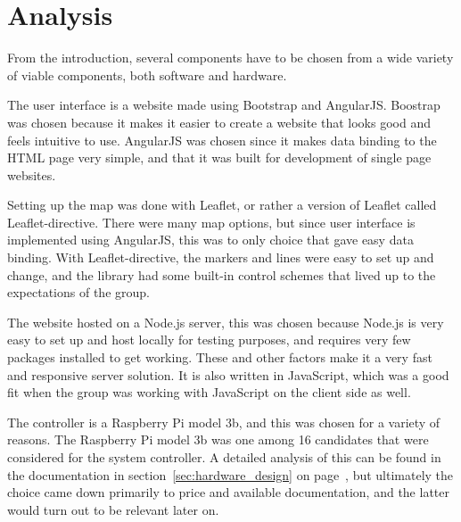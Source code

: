 \chapter{Analysis}

From the introduction, several components have to be chosen from a wide variety of viable components, both software and hardware.

The user interface is a website made using Bootstrap\cite{bootstrap} and AngularJS\cite{angular}. 
Boostrap was chosen because it makes it easier to create a website that looks good and feels intuitive to use.
AngularJS was chosen since it makes data binding to the HTML page very simple, and that it was built for development of single page websites.

Setting up the map was done with Leaflet, or rather a version of Leaflet called Leaflet-directive\cite{leaflet}. There were many map options, but since user interface is implemented using AngularJS, this was to only choice that gave easy data binding. With Leaflet-directive, the markers and lines were easy to set up and change, and the library had some built-in control schemes that lived up to the expectations of the group.

The website hosted on a Node.js server\cite{nodejs}, this was chosen because Node.js is very easy to set up and host locally for testing purposes, and requires very few packages installed to get working. These and other factors make it a very fast and responsive server solution\cite{NodeJS_fast}. It is also written in JavaScript, which was a good fit when the group was working with JavaScript on the client side as well.

The controller is a Raspberry Pi model 3b, and this was chosen for a variety of reasons. The Raspberry Pi model 3b was one among 16 candidates that were considered for the system controller. A detailed analysis of this can be found in the documentation in section~\ref{sec:hardware_design} on page~\pageref{sec:hardware_design}, but ultimately the choice came down primarily to price and available documentation, and the latter would turn out to be relevant later on.

